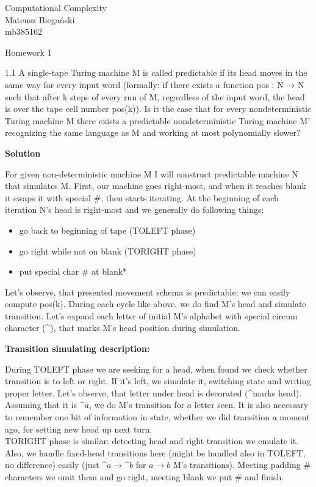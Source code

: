\documentclass[12pt]{article}
\begin{document}

\begin{flushright}
    Computational Complexity \\
    Mateusz Biegański \\ 
    mb385162
\end{flushright}

\begin{center}
    \Large Homework 1 \normalsize
\end{center}

1.1    A single-tape Turing machine M is called predictable if its head moves
in the same way for every input word (formally: if there exists a function pos : N → N such
that after k steps of every run of M, regardless of the input word, the head is over the tape cell
number pos(k)). Is it the case that for every nondeterministic Turing machine M there exists
a predictable nondeterministic Turing machine M'
recognizing the same language as M and
working at most polynomially slower?

{\bf Solution}

For given non-deterministic machine M I will construct predictable machine N that simulates M.
First, our machine goes right-most, and when it reaches blank it swaps it with special \#, then starts iterating.
At the beginning of each iteration N's head is right-most 
and we generally do following things:
\begin{itemize}
    \item go back to beginning of tape (TOLEFT phase)
    \item go right while not on blank (TORIGHT phase)
    \item put special char \# at blank*
\end{itemize}
Let's observe, that presented movement schema is predictable: we can easily compute pos(k).
During each cycle like above, we do find M's head and simulate transition. Let's expand each letter of initial M's alphabet with special circum character (\textasciicircum ), that marks M's head position during simulation. 

\textbf{Transition simulating description:}

During TOLEFT phase we are seeking for a head, when found we check whether transition is to left or right. If it's left, we simulate it, switching state and writing proper letter. Let's observe, that letter under head is decorated (\textasciicircum marks head). Assuming that it is $\^{a}$, we do M's transition for $a$ letter seen. It is also necessary to remember one bit of information in state, whether we did transition a moment ago, for setting new head up next turn.
\\
TORIGHT phase is similar: detecting head and right transition we emulate it. Also, we handle fixed-head transitions here (might be handled also in TOLEFT, no difference) easily (just $\^{a} \to \^{b}$ for $a \to b$ M's transitions). Meeting padding \# characters we omit them and go right, meeting blank we put \# and finish.
\end{document}
